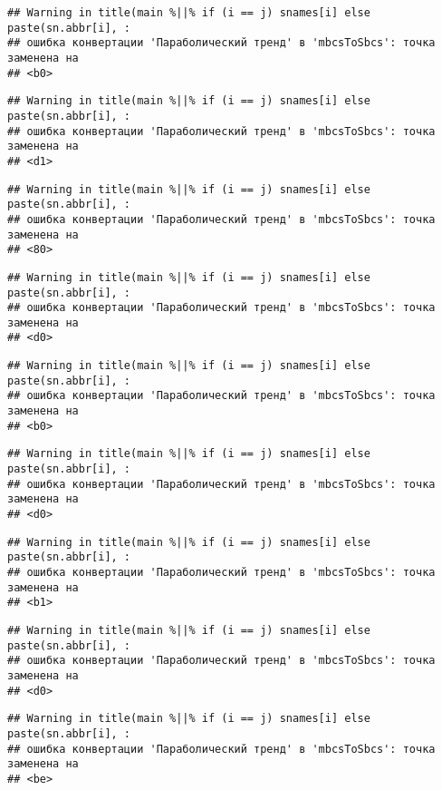 \documentclass[
]{article}
\begin{document}
\begin{verbatim}
## Warning in title(main %||% if (i == j) snames[i] else paste(sn.abbr[i], :
## ошибка конвертации 'Параболический тренд' в 'mbcsToSbcs': точка заменена на
## <b0>
\end{verbatim}

\begin{verbatim}
## Warning in title(main %||% if (i == j) snames[i] else paste(sn.abbr[i], :
## ошибка конвертации 'Параболический тренд' в 'mbcsToSbcs': точка заменена на
## <d1>
\end{verbatim}

\begin{verbatim}
## Warning in title(main %||% if (i == j) snames[i] else paste(sn.abbr[i], :
## ошибка конвертации 'Параболический тренд' в 'mbcsToSbcs': точка заменена на
## <80>
\end{verbatim}

\begin{verbatim}
## Warning in title(main %||% if (i == j) snames[i] else paste(sn.abbr[i], :
## ошибка конвертации 'Параболический тренд' в 'mbcsToSbcs': точка заменена на
## <d0>
\end{verbatim}

\begin{verbatim}
## Warning in title(main %||% if (i == j) snames[i] else paste(sn.abbr[i], :
## ошибка конвертации 'Параболический тренд' в 'mbcsToSbcs': точка заменена на
## <b0>
\end{verbatim}

\begin{verbatim}
## Warning in title(main %||% if (i == j) snames[i] else paste(sn.abbr[i], :
## ошибка конвертации 'Параболический тренд' в 'mbcsToSbcs': точка заменена на
## <d0>
\end{verbatim}

\begin{verbatim}
## Warning in title(main %||% if (i == j) snames[i] else paste(sn.abbr[i], :
## ошибка конвертации 'Параболический тренд' в 'mbcsToSbcs': точка заменена на
## <b1>
\end{verbatim}

\begin{verbatim}
## Warning in title(main %||% if (i == j) snames[i] else paste(sn.abbr[i], :
## ошибка конвертации 'Параболический тренд' в 'mbcsToSbcs': точка заменена на
## <d0>
\end{verbatim}

\begin{verbatim}
## Warning in title(main %||% if (i == j) snames[i] else paste(sn.abbr[i], :
## ошибка конвертации 'Параболический тренд' в 'mbcsToSbcs': точка заменена на
## <be>
\end{verbatim}
\end{document}
